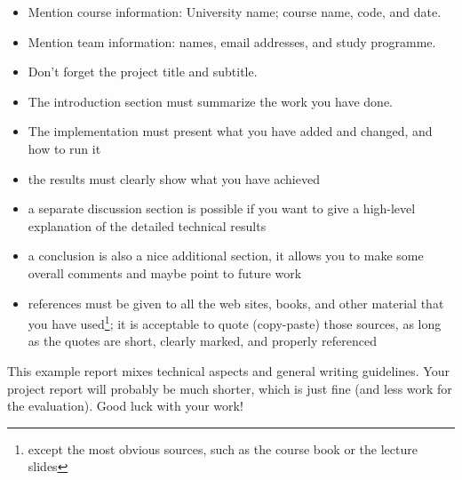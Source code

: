\documentclass[a4paper,10pt]{article}
\begin{document}
\begin{itemize}
\item Mention course information: University name; course name, code, and date.
\item Mention team information: names, email addresses, and study programme.
\item Don't forget the project title and subtitle.
\item The introduction section must summarize the work you have done.
\item The implementation must present what you have added and changed, and how to run it
\item the results must clearly show what you have achieved
\item a separate discussion section is possible if you want to give a high-level explanation of the detailed technical results
\item a conclusion is also a nice additional section, it allows you to make some overall comments and maybe point to future work
\item references must be given to all the web sites, books, and other material that you have used\footnote{
  except the most obvious sources, such as the course book or the lecture slides};
  it is acceptable to quote (copy-paste) those sources, as long as the quotes are short, clearly marked, and properly referenced
\end{itemize}

This example report mixes technical aspects and general writing guidelines.
Your project report will probably be much shorter, which is just fine (and less work for the evaluation).
Good luck with your work!





\end{document}
